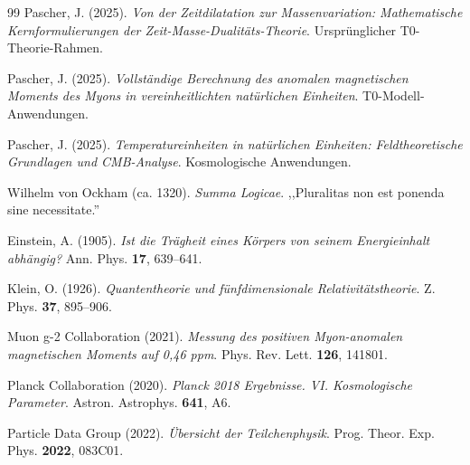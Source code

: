 \begin{thebibliography}{99}
		Pascher, J. (2025). \textit{Von der Zeitdilatation zur Massenvariation: Mathematische Kernformulierungen der Zeit-Masse-Dualitäts-Theorie}. Ursprünglicher T0-Theorie-Rahmen.
		
		Pascher, J. (2025). \textit{Vollständige Berechnung des anomalen magnetischen Moments des Myons in vereinheitlichten natürlichen Einheiten}. T0-Modell-Anwendungen.
		
		Pascher, J. (2025). \textit{Temperatureinheiten in natürlichen Einheiten: Feldtheoretische Grundlagen und CMB-Analyse}. Kosmologische Anwendungen.
		
		Wilhelm von Ockham (ca. 1320). \textit{Summa Logicae}. ,,Pluralitas non est ponenda sine necessitate.''
		
		Einstein, A. (1905). \textit{Ist die Trägheit eines Körpers von seinem Energieinhalt abhängig?} Ann. Phys. \textbf{17}, 639--641.
		
		Klein, O. (1926). \textit{Quantentheorie und fünfdimensionale Relativitätstheorie}. Z. Phys. \textbf{37}, 895--906.
		
		Muon g-2 Collaboration (2021). \textit{Messung des positiven Myon-anomalen magnetischen Moments auf 0{,}46 ppm}. Phys. Rev. Lett. \textbf{126}, 141801.
		
		Planck Collaboration (2020). \textit{Planck 2018 Ergebnisse. VI. Kosmologische Parameter}. Astron. Astrophys. \textbf{641}, A6.
		
		Particle Data Group (2022). \textit{Übersicht der Teilchenphysik}. Prog. Theor. Exp. Phys. \textbf{2022}, 083C01.
	\end{thebibliography}
